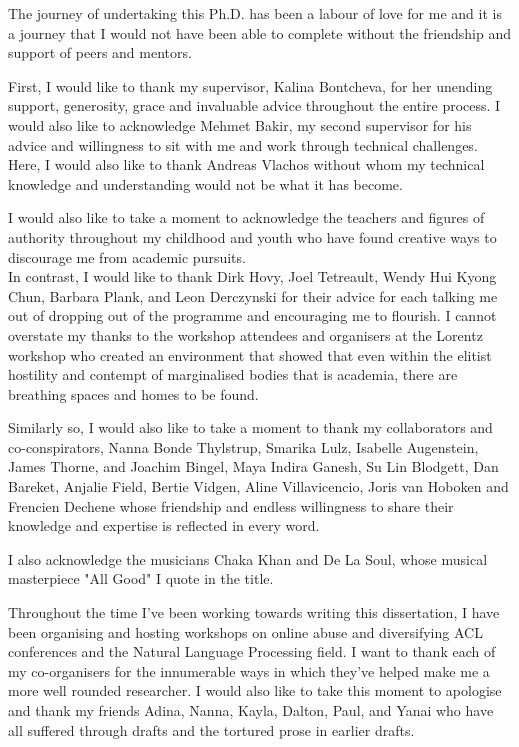
\begin{acknowledgements}      

The journey of undertaking this Ph.D. has been a labour of love for me and it is a journey that I would not have been able to complete without the friendship and support of peers and mentors.

First, I would like to thank my supervisor, Kalina Bontcheva, for her unending support, generosity, grace and invaluable advice throughout the entire process.
I would also like to acknowledge Mehmet Bakir, my second supervisor for his advice and willingness to sit with me and work through technical challenges.
Here, I would also like to thank Andreas Vlachos without whom my technical knowledge and understanding would not be what it has become.

I would also like to take a moment to acknowledge the teachers and figures of authority throughout my childhood and youth who have found creative ways to discourage me from academic pursuits.\\
In contrast, I would like to thank Dirk Hovy, Joel Tetreault, Wendy Hui Kyong Chun, Barbara Plank, and Leon Derczynski for their advice for each talking me out of dropping out of the programme and encouraging me to flourish.
I cannot overstate my thanks to the workshop attendees and organisers at the Lorentz workshop who created an environment that showed that even within the elitist hostility and contempt of marginalised bodies that is academia, there are breathing spaces and homes to be found.


Similarly so, I would also like to take a moment to thank my collaborators and co-conspirators, Nanna Bonde Thylstrup, Smarika Lulz, Isabelle Augenstein, James Thorne, and Joachim Bingel, Maya Indira Ganesh, Su Lin Blodgett, Dan Bareket, Anjalie Field, Bertie Vidgen, Aline Villavicencio, Joris van Hoboken and Frencien Dechene whose friendship and endless willingness to share their knowledge and expertise is reflected in every word.

I also acknowledge the musicians Chaka Khan and De La Soul, whose musical masterpiece "All Good" I quote in the title.

Throughout the time I've been working towards writing this dissertation, I have been organising and hosting workshops on online abuse and diversifying ACL conferences and the Natural Language Processing field.
I want to thank each of my co-organisers for the innumerable ways in which they've helped make me a more well rounded researcher.
I would also like to take this moment to apologise and thank my friends Adina, Nanna, Kayla, Dalton, Paul, and Yanai who have all suffered through drafts and the tortured prose in earlier drafts.


\end{acknowledgements}
